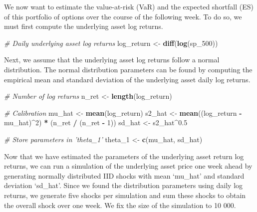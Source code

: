 \documentclass[]{article}
\newenvironment{Shaded}{\begin{snugshade}}{\end{snugshade}}
\newcommand{\CommentTok}[1]{\textcolor[rgb]{0.56,0.35,0.01}{\textit{#1}}}
\newcommand{\DecValTok}[1]{\textcolor[rgb]{0.00,0.00,0.81}{#1}}
\newcommand{\FloatTok}[1]{\textcolor[rgb]{0.00,0.00,0.81}{#1}}
\newcommand{\KeywordTok}[1]{\textcolor[rgb]{0.13,0.29,0.53}{\textbf{#1}}}
\newcommand{\NormalTok}[1]{#1}
\newcommand{\OperatorTok}[1]{\textcolor[rgb]{0.81,0.36,0.00}{\textbf{#1}}}
\newcommand{\StringTok}[1]{\textcolor[rgb]{0.31,0.60,0.02}{#1}}
\begin{document}
We now want to estimate the value-at-risk (VaR) and the expected
shortfall (ES) of this portfolio of options over the course of the
following week. To do so, we must first compute the underlying asset log
returns.

\begin{Shaded}
\begin{Highlighting}[]
\CommentTok{# Daily underlying asset log returns}
\NormalTok{log_return <-}\StringTok{ }\KeywordTok{diff}\NormalTok{(}\KeywordTok{log}\NormalTok{(sp_}\DecValTok{500}\NormalTok{))}
\end{Highlighting}
\end{Shaded}

Next, we assume that the underlying asset log returns follow a normal
distribution. The normal distribution parameters can be found by
computing the empirical mean and standard deviation of the underlying
asset daily log returns.

\begin{Shaded}
\begin{Highlighting}[]
\CommentTok{# Number of log returns}
\NormalTok{n_ret <-}\StringTok{ }\KeywordTok{length}\NormalTok{(log_return)}

\CommentTok{# Calibration}
\NormalTok{mu_hat <-}\StringTok{ }\KeywordTok{mean}\NormalTok{(log_return)}
\NormalTok{s2_hat <-}\StringTok{ }\KeywordTok{mean}\NormalTok{((log_return }\OperatorTok{-}\StringTok{ }\NormalTok{mu_hat)}\OperatorTok{^}\DecValTok{2}\NormalTok{) }\OperatorTok{*}\StringTok{ }\NormalTok{(n_ret }\OperatorTok{/}\StringTok{ }\NormalTok{(n_ret }\OperatorTok{-}\StringTok{ }\DecValTok{1}\NormalTok{))}
\NormalTok{sd_hat  <-}\StringTok{ }\NormalTok{s2_hat}\OperatorTok{^}\FloatTok{0.5}

\CommentTok{# Store parameters in 'theta_1'}
\NormalTok{theta_}\DecValTok{1}\NormalTok{ <-}\StringTok{ }\KeywordTok{c}\NormalTok{(mu_hat, sd_hat)}
\end{Highlighting}
\end{Shaded}

Now that we have estimated the parameters of the underlying asset return
log returns, we can run a simulation of the underlying asset price one
week ahead by generating normally distributed IID shocks with mean
`mu\_hat' and standard deviation `sd\_hat'. Since we found the
distribution parameters using daily log returns, we generate five shocks
per simulation and sum these shocks to obtain the overall shock over one
week. We fix the size of the simulation to 10 000.
\end{document}
